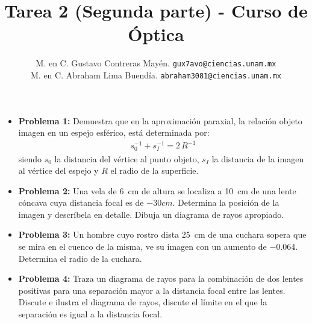 \documentclass[14pt]{extarticle}
\author{\normalsize{M. en C. Gustavo Contreras Mayén.} \quad \normalsize{\texttt{gux7avo@ciencias.unam.mx}} \\
\normalsize{M. en C. Abraham Lima Buendía.} \quad \normalsize{\texttt{abraham3081@ciencias.unam.mx}}}
\title{\vspace*{-2cm} Tarea 2 (Segunda parte) - Curso de Óptica}
\date{ }
\begin{document}
\maketitle
\fontsize{14}{14}\selectfont


\begin{itemize}
\item \textbf{Problema 1:} Demuestra que en la aproximación paraxial, la relación objeto imagen en un espejo esférico, está determinada por:
\begin{align*}
s_{0}^{-1} + s_{I}^{-1} = 2 \, R^{-1}
\end{align*}
siendo $s_{0}$ la distancia del vértice al punto objeto, $s_{I}$ la distancia de la imagen al vértice del espejo y $R$ el radio de la superficie.
\item \textbf{Problema 2:} Una vela de \SI{6}{\centi\meter} de altura se localiza a \SI{10}{\centi\meter} de una lente cóncava cuya distancia focal es de $-30cm$. Determina la posición de la imagen y descríbela en detalle. Dibuja un diagrama de rayos apropiado.
\item \textbf{Problema 3:} Un hombre cuyo rostro dista \SI{25}{\centi\meter} de una cuchara sopera que se mira en el cuenco de la misma, ve su imagen con un aumento de $-0.064$. Determina el radio de la cuchara.
\item \textbf{Problema 4:} Traza un diagrama de rayos para la combinación de dos lentes positivas para una separación mayor a la distancia focal entre las lentes. Discute e ilustra el diagrama de rayos, discute el límite en el que la separación es igual a la distancia focal.
\end{itemize}
\end{document}
